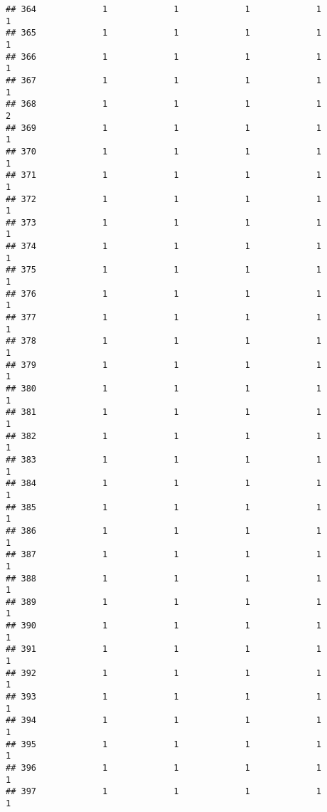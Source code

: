 \documentclass[
]{article}
\begin{document}
\begin{verbatim}
## 364             1             1             1             1             1
## 365             1             1             1             1             1
## 366             1             1             1             1             1
## 367             1             1             1             1             1
## 368             1             1             1             1             2
## 369             1             1             1             1             1
## 370             1             1             1             1             1
## 371             1             1             1             1             1
## 372             1             1             1             1             1
## 373             1             1             1             1             1
## 374             1             1             1             1             1
## 375             1             1             1             1             1
## 376             1             1             1             1             1
## 377             1             1             1             1             1
## 378             1             1             1             1             1
## 379             1             1             1             1             1
## 380             1             1             1             1             1
## 381             1             1             1             1             1
## 382             1             1             1             1             1
## 383             1             1             1             1             1
## 384             1             1             1             1             1
## 385             1             1             1             1             1
## 386             1             1             1             1             1
## 387             1             1             1             1             1
## 388             1             1             1             1             1
## 389             1             1             1             1             1
## 390             1             1             1             1             1
## 391             1             1             1             1             1
## 392             1             1             1             1             1
## 393             1             1             1             1             1
## 394             1             1             1             1             1
## 395             1             1             1             1             1
## 396             1             1             1             1             1
## 397             1             1             1             1             1

\end{verbatim}
\end{document}
